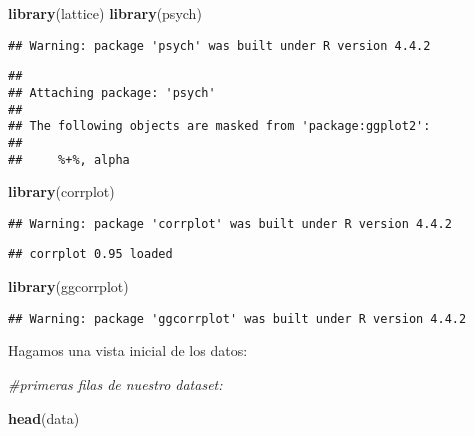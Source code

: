 \documentclass[
]{article}
\newenvironment{Shaded}{\begin{snugshade}}{\end{snugshade}}
\newcommand{\CommentTok}[1]{\textcolor[rgb]{0.56,0.35,0.01}{\textit{#1}}}
\newcommand{\FunctionTok}[1]{\textcolor[rgb]{0.13,0.29,0.53}{\textbf{#1}}}
\newcommand{\NormalTok}[1]{#1}
\begin{document}
\begin{Shaded}
\begin{Highlighting}[]
\FunctionTok{library}\NormalTok{(lattice)}
\FunctionTok{library}\NormalTok{(psych)}
\end{Highlighting}
\end{Shaded}

\begin{verbatim}
## Warning: package 'psych' was built under R version 4.4.2
\end{verbatim}

\begin{verbatim}
## 
## Attaching package: 'psych'
## 
## The following objects are masked from 'package:ggplot2':
## 
##     %+%, alpha
\end{verbatim}

\begin{Shaded}
\begin{Highlighting}[]
\FunctionTok{library}\NormalTok{(corrplot)}
\end{Highlighting}
\end{Shaded}

\begin{verbatim}
## Warning: package 'corrplot' was built under R version 4.4.2
\end{verbatim}

\begin{verbatim}
## corrplot 0.95 loaded
\end{verbatim}

\begin{Shaded}
\begin{Highlighting}[]
\FunctionTok{library}\NormalTok{(ggcorrplot)}
\end{Highlighting}
\end{Shaded}

\begin{verbatim}
## Warning: package 'ggcorrplot' was built under R version 4.4.2
\end{verbatim}

Hagamos una vista inicial de los datos:

\begin{Shaded}
\begin{Highlighting}[]
\CommentTok{\#primeras filas de nuestro dataset:}

\FunctionTok{head}\NormalTok{(data)}
\end{Highlighting}
\end{Shaded}
\end{document}
